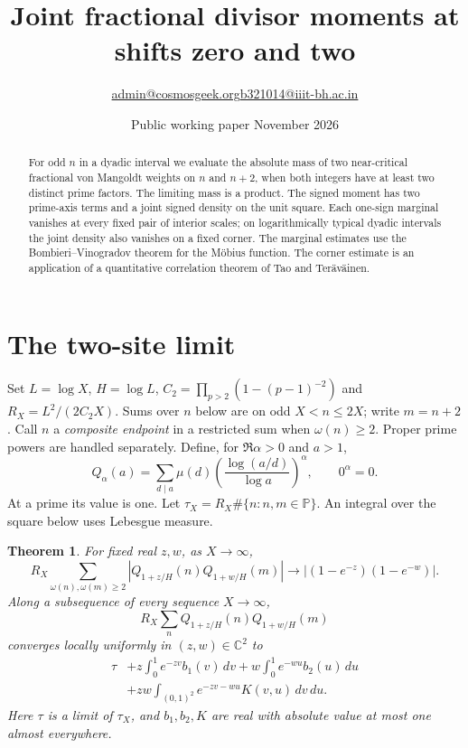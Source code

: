 \documentclass[11pt]{article}
\title{Joint fractional divisor moments at shifts zero and two}
\author{\small \href{mailto:admin@cosmosgeek.org}{admin@cosmosgeek.org}\qquad \href{mailto:b321014@iiit-bh.ac.in}{b321014@iiit-bh.ac.in}}
\date{Public working paper\quad 25 November 2026}
\newtheorem{theorem}{Theorem}[section]
\newcommand{\PP}{\mathbb P}
\begin{document}
\maketitle
\begin{abstract}
For odd $n$ in a dyadic interval we evaluate the absolute mass of
two near-critical fractional von Mangoldt weights on $n$ and $n+2$,
when both integers have at least two distinct prime factors. The
limiting mass is a product. The signed moment has two prime-axis
terms and a joint signed density on the unit square. Each one-sign
marginal vanishes at every fixed pair of interior scales; on
logarithmically typical dyadic intervals the joint density also
vanishes on a fixed corner. The marginal estimates use the
Bombieri--Vinogradov theorem for the M\"obius function. The corner
estimate is an application of a quantitative correlation theorem
of Tao and Ter\"av\"ainen.
\end{abstract}

\section{The two-site limit}

Set $L=\log X$, $H=\log L$, $C_2=\prod_{p>2}(1-(p-1)^{-2})$ and
$R_X=L^2/(2C_2X)$. Sums over $n$ below are on odd $X<n\le 2X$;
write $m=n+2$. Call $n$ a \emph{composite endpoint} in a restricted
sum when $\omega(n)\ge2$. Proper prime powers are handled separately.
Define, for $\Re\alpha>0$ and $a>1$,
\[
Q_\alpha(a)=\sum_{d\mid a}\mu(d)
 \left(\frac{\log(a/d)}{\log a}\right)^\alpha,\qquad 0^\alpha=0 .
\]
At a prime its value is one. Let $\tau_X=R_X\#\{n:n,m\in\PP\}$.
An integral over the square below uses Lebesgue measure.

\begin{theorem}\label{main}
For fixed real $z,w$, as $X\to\infty$,
\[
 R_X\sum_{\omega(n),\omega(m)\ge2}
 |Q_{1+z/H}(n)Q_{1+w/H}(m)|
 \longrightarrow |(1-e^{-z})(1-e^{-w})|.
\]
Along a subsequence of every sequence $X\to\infty$,
\[ R_X\sum_n Q_{1+z/H}(n)Q_{1+w/H}(m) \]
converges locally uniformly in $(z,w)\in\mathbb C^2$ to
\begin{align*}
\tau&+z\int_0^1 e^{-zv}b_1(v)\,dv
     +w\int_0^1 e^{-wu}b_2(u)\,du\\
 &+zw\int_{(0,1)^2}e^{-zv-wu}K(v,u)\,dv\,du.
\end{align*}
Here $\tau$ is a limit of $\tau_X$, and $b_1,b_2,K$ are real
with absolute value at most one almost everywhere.
\end{theorem}
\end{document}
